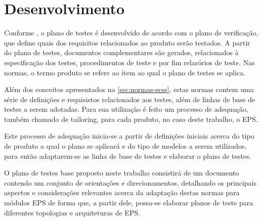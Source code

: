 \chapter{Desenvolvimento} \label{cap:desenvolvimento}


Conforme \textcite{ecss-e-st-10-03}, o plano de testes é desenvolvido de acordo com o plano de verificação, que define quais dos requisitos relacionados ao produto serão testados.
A partir do plano de testes, documentos complementares são gerados, relacionados à especificação dos testes, procedimentos de teste e por fim relarórios de teste.
Nas normas, o termo produto se refere ao item ao qual o plano de testes se aplica.

Além dos conceitos apresentados na \autoref{sec:normas-ecss}, estas normas contem uma série de definições e requisistos relacionados aos testes, além de linhas de base de testes a serem adotadas.
Para sua utilização é feito um processo de adequação, também chamado de tailoring, para cada produto, no caso deste trabalho, o \gls{EPS}.

Este processo de adequação inicia-se a partir de definições iniciais acerca do tipo de produto a qual o plano se aplicará e do tipo de modelos a serem utilizados, para então adaptarem-se as linha de base de testes e elaborar o plano de testes.

O plano de testes base proposto neste trabalho consistirá de um documento contendo um conjunto de orientações e direcionamentos, detalhando os principais aspectos e considerações relevantes acerca da adaptação destas normas para módulos \gls{EPS} de forma que, a partir dele, possa-se elaborar planos de teste para diferentes topologias e arquiteturas de \gls{EPS}.






